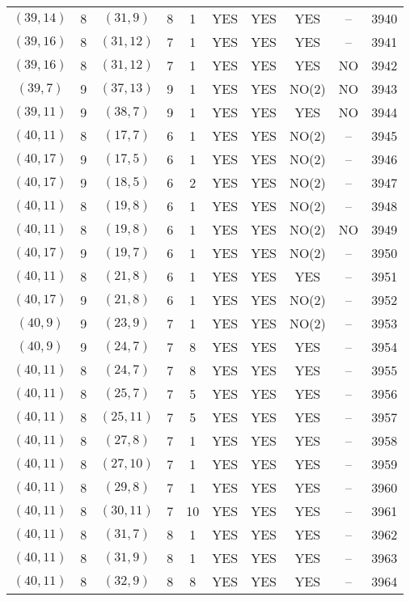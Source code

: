 \begin{longtable}{|c|c|c|c|c|c|c|c|c|c|}
$(39, 14)$ & 8 & $(31, 9)$ & 8 & 1 & YES & YES & YES & -- & 3940\\
$(39, 16)$ & 8 & $(31, 12)$ & 7 & 1 & YES & YES & YES & -- & 3941\\
$(39, 16)$ & 8 & $(31, 12)$ & 7 & 1 & YES & YES & YES & NO & 3942\\
$(39, 7)$ & 9 & $(37, 13)$ & 9 & 1 & YES & YES & NO(2) & NO & 3943\\
$(39, 11)$ & 9 & $(38, 7)$ & 9 & 1 & YES & YES & YES & NO & 3944\\
$(40, 11)$ & 8 & $(17, 7)$ & 6 & 1 & YES & YES & NO(2) & -- & 3945\\
$(40, 17)$ & 9 & $(17, 5)$ & 6 & 1 & YES & YES & NO(2) & -- & 3946\\
$(40, 17)$ & 9 & $(18, 5)$ & 6 & 2 & YES & YES & NO(2) & -- & 3947\\
$(40, 11)$ & 8 & $(19, 8)$ & 6 & 1 & YES & YES & NO(2) & -- & 3948\\
$(40, 11)$ & 8 & $(19, 8)$ & 6 & 1 & YES & YES & NO(2) & NO & 3949\\
$(40, 17)$ & 9 & $(19, 7)$ & 6 & 1 & YES & YES & NO(2) & -- & 3950\\
$(40, 11)$ & 8 & $(21, 8)$ & 6 & 1 & YES & YES & YES & -- & 3951\\
$(40, 17)$ & 9 & $(21, 8)$ & 6 & 1 & YES & YES & NO(2) & -- & 3952\\
$(40, 9)$ & 9 & $(23, 9)$ & 7 & 1 & YES & YES & NO(2) & -- & 3953\\
$(40, 9)$ & 9 & $(24, 7)$ & 7 & 8 & YES & YES & YES & -- & 3954\\
$(40, 11)$ & 8 & $(24, 7)$ & 7 & 8 & YES & YES & YES & -- & 3955\\
$(40, 11)$ & 8 & $(25, 7)$ & 7 & 5 & YES & YES & YES & -- & 3956\\
$(40, 11)$ & 8 & $(25, 11)$ & 7 & 5 & YES & YES & YES & -- & 3957\\
$(40, 11)$ & 8 & $(27, 8)$ & 7 & 1 & YES & YES & YES & -- & 3958\\
$(40, 11)$ & 8 & $(27, 10)$ & 7 & 1 & YES & YES & YES & -- & 3959\\
$(40, 11)$ & 8 & $(29, 8)$ & 7 & 1 & YES & YES & YES & -- & 3960\\
$(40, 11)$ & 8 & $(30, 11)$ & 7 & 10 & YES & YES & YES & -- & 3961\\
$(40, 11)$ & 8 & $(31, 7)$ & 8 & 1 & YES & YES & YES & -- & 3962\\
$(40, 11)$ & 8 & $(31, 9)$ & 8 & 1 & YES & YES & YES & -- & 3963\\
$(40, 11)$ & 8 & $(32, 9)$ & 8 & 8 & YES & YES & YES & -- & 3964\\

\end{longtable}
